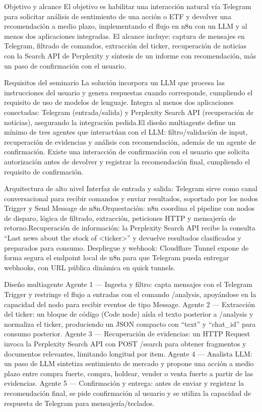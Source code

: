 Objetivo y alcance
El objetivo es habilitar una interacción natural vía Telegram para solicitar análisis de sentimiento de una acción o ETF y devolver una recomendación a medio plazo, implementando el flujo en n8n con un LLM y al menos dos aplicaciones integradas.​​
El alcance incluye: captura de mensajes en Telegram, filtrado de comandos, extracción del ticker, recuperación de noticias con la Search API de Perplexity y síntesis de un informe con recomendación, más un paso de confirmación con el usuario.​​

Requisitos del seminario
La solución incorpora un LLM que procesa las instrucciones del usuario y genera respuestas cuando corresponde, cumpliendo el requisito de uso de modelos de lenguaje.​​
Integra al menos dos aplicaciones conectadas: Telegram (entrada/salida) y Perplexity Search API (recuperación de noticias), asegurando la integración pedida.​​
El diseño multiagente define un mínimo de tres agentes que interactúan con el LLM: filtro/validación de input, recuperación de evidencias y análisis con recomendación, además de un agente de confirmación.​​
Existe una interacción de confirmación con el usuario que solicita autorización antes de devolver y registrar la recomendación final, cumpliendo el requisito de confirmación.​​

Arquitectura de alto nivel
Interfaz de entrada y salida: Telegram sirve como canal conversacional para recibir comandos y enviar resultados, soportado por los nodos Trigger y Send Message de n8n.​
Orquestación: n8n coordina el pipeline con nodos de disparo, lógica de filtrado, extracción, peticiones HTTP y mensajería de retorno.​
Recuperación de información: la Perplexity Search API recibe la consulta “Last news about the stock of <ticker>” y devuelve resultados clasificados y preparados para consumo.​
Despliegue y webhook: Cloudflare Tunnel expone de forma segura el endpoint local de n8n para que Telegram pueda entregar webhooks, con URL pública dinámica en quick tunnels.​

Diseño multiagente
Agente 1 — Ingesta y filtro: capta mensajes con el Telegram Trigger y restringe el flujo a entradas con el comando /analysis, apoyándose en la capacidad del nodo para recibir eventos de tipo Message.​
Agente 2 — Extracción del ticker: un bloque de código (Code node) aísla el texto posterior a /analysis y normaliza el ticker, produciendo un JSON compacto con “text” y “chat_id” para consumo posterior.​
Agente 3 — Recuperación de evidencias: un HTTP Request invoca la Perplexity Search API con POST /search para obtener fragmentos y documentos relevantes, limitando longitud por item.​
Agente 4 — Analista LLM: un paso de LLM sintetiza sentimiento de mercado y propone una acción a medio plazo entre compra fuerte, compra, holdear, vender o venta fuerte a partir de las evidencias.​
Agente 5 — Confirmación y entrega: antes de enviar y registrar la recomendación final, se pide confirmación al usuario y se utiliza la capacidad de respuesta de Telegram para mensajería/teclados.​

